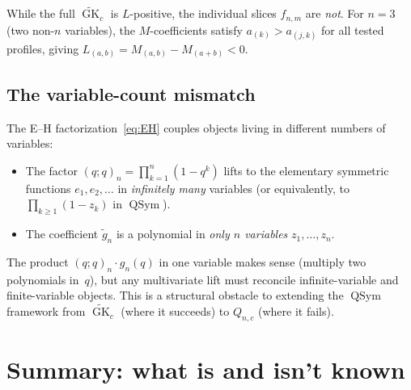 \documentclass[11pt]{article}
\newcommand{\GK}{\operatorname{GK}}
\newcommand{\QSym}{\operatorname{QSym}}
\newcommand{\qpochn}[3]{(#1;#2)_{#3}}
\begin{document}
While the full $\widetilde{\GK}_c$ is $L$-positive, the
individual slices $f_{n,m}$ are \emph{not}. For $n = 3$
(two non-$n$ variables), the $M$-coefficients satisfy
$a_{(k)} > a_{(j,k)}$ for all tested profiles, giving
$L_{(a,b)} = M_{(a,b)} - M_{(a+b)} < 0$.

\subsection{The variable-count mismatch}
\label{sec:mismatch}

The E--H factorization~\eqref{eq:EH} couples objects living
in different numbers of variables:
\begin{itemize}
  \item The factor $\qpochn{q}{q}{n} = \prod_{k=1}^{n}(1 - q^k)$
    lifts to the elementary symmetric functions
    $e_1, e_2, \ldots$ in \emph{infinitely many} variables
    (or equivalently, to $\prod_{k \geq 1}(1 - z_k)$
    in $\QSym$).
  \item The coefficient $\tilde{g}_n$ is a polynomial in
    \emph{only $n$ variables} $z_1, \ldots, z_n$.
\end{itemize}

The product $\qpochn{q}{q}{n} \cdot g_n(q)$ in one variable
makes sense (multiply two polynomials in~$q$), but any
multivariate lift must reconcile infinite-variable and
finite-variable objects. This is a structural obstacle to
extending the $\QSym$ framework from $\widetilde{\GK}_c$
(where it succeeds) to $Q_{n,c}$ (where it fails).

\section{Summary: what is and isn't known}
\label{sec:summary}
\end{document}
